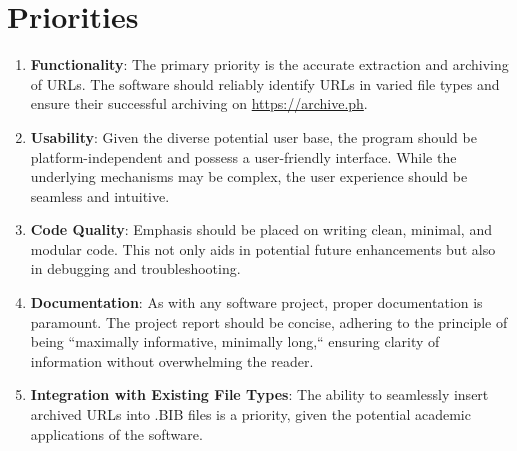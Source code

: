 \section{Priorities}
\begin{enumerate}
    \item \textbf{Functionality}: The primary priority is the accurate extraction and archiving of URLs. The software should reliably identify URLs in varied file types and ensure their successful archiving on \href{https://archive.ph}{https://archive.ph}.
    \item \textbf{Usability}: Given the diverse potential user base, the program should be platform-independent and possess a user-friendly interface. While the underlying mechanisms may be complex, the user experience should be seamless and intuitive.
    \item \textbf{Code Quality}: Emphasis should be placed on writing clean, minimal, and modular code. This not only aids in potential future enhancements but also in debugging and troubleshooting.
    \item \textbf{Documentation}: As with any software project, proper documentation is paramount. The project report should be concise, adhering to the principle of being ``maximally informative, minimally long,`` ensuring clarity of information without overwhelming the reader.
    \item \textbf{Integration with Existing File Types}: The ability to seamlessly insert archived URLs into .BIB files is a priority, given the potential academic applications of the software.
\end{enumerate}